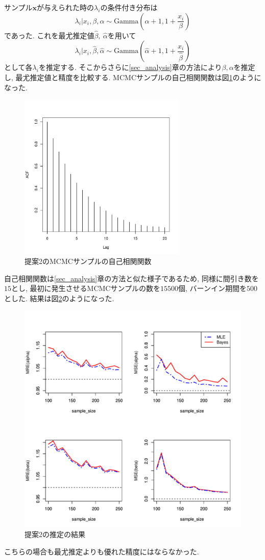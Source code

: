 \documentclass[titlepage,twoside]{jarticle}
\theoremstyle{definition}
\begin{document}
サンプル$\bm{x}$が与えられた時の$\lambda_i$の条件付き分布は
$$
\lambda _{i}|x_i,\beta ,\alpha 
\sim 
\mbox{Gamma} \left(\alpha +1,1+\frac{x_{i}}{\beta }\right)
$$
であった.
これを最尤推定値$\hat{\beta },~\hat{\alpha }$を用いて
$$
\lambda _{i}|x_i,\hat{\beta } ,\hat{\alpha } 
\sim 
\mbox{Gamma} \left(\hat{\alpha } +1,1+\frac{x_{i}}{\hat{\beta }}\right)
$$
として各$\lambda_i$を推定する. そこからさらに\ref{sec_analysis}章の方法により$\beta ,\alpha $を推定し, 最尤推定値と精度を比較する. 
MCMCサンプルの自己相関関数は図\ref{fig5}のようになった.
\begin{figure}[ht]
\begin{center}
\includegraphics[width=80mm]{acf_mle-bayes}
\caption{提案2のMCMCサンプルの自己相関関数}
\label{fig5}
\end{center}
\end{figure}
自己相関関数は\ref{sec_analysis}章の方法と似た様子であるため, 同様に間引き数を$15$とし, 最初に発生させるMCMCサンプルの数を$15500$個, バーンイン期間を$500$とした.
結果は図\ref{fig6}のようになった.
\begin{figure}[ht]
\begin{center}
\includegraphics[width=120mm]{mle-bayes}
\caption{提案2の推定の結果}
\label{fig6}
\end{center}
\end{figure}
こちらの場合も最尤推定よりも優れた精度にはならなかった.
\end{document}
